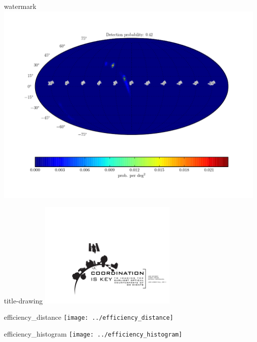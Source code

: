 \documentclass[portrait]{a0poster}
\begin{document}
\begin{staticcontents*}{watermark}
\includegraphics[scale=2]{example-no-interference}
\end{staticcontents*}

\begin{staticcontents*}{title-drawing}
\includegraphics[width=0.5\textwidth]{title-drawing.pdf}
\end{staticcontents*}

\begin{staticcontents*}{efficiency_distance}
\texttt{[image: ../efficiency\_distance]}
\end{staticcontents*}

\begin{staticcontents*}{efficiency_histogram}
\texttt{[image: ../efficiency\_histogram]}
\end{staticcontents*}
\end{document}
